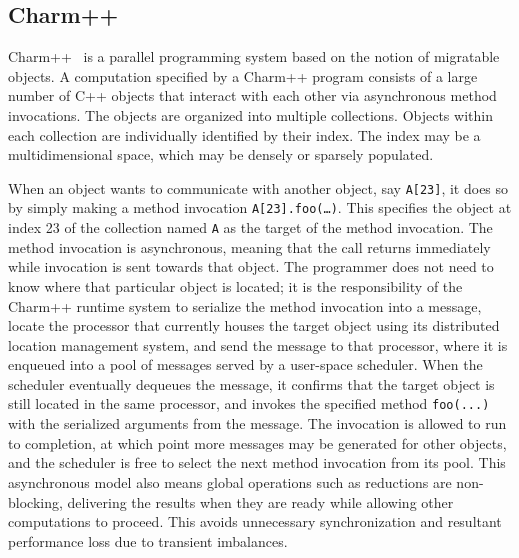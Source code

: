 \documentclass[12pt,letterpaper]{article}
\begin{document}
\subsection{Charm++}
\label{sec:charm}
Charm++~\cite{charm-zenodo, Kale2013, charm2014sc} is a parallel programming system based on the notion of migratable objects. A computation specified by a Charm++ program consists of a large number of C++ objects that interact with each other via asynchronous method invocations. The objects are organized into multiple collections. Objects within each collection are individually identified by their index. The index may be a multidimensional space, which may be densely or sparsely populated.

When an object wants to communicate with another object, say \texttt{A[23]}, it does so by simply making a method invocation \texttt{A[23].foo(…)}. This specifies the object at index 23 of the collection named \texttt{A} as the target of the method invocation. The method invocation is asynchronous, meaning that the call returns immediately while invocation is sent towards that object. The programmer does not need to know where that particular object is located; it is the responsibility of the Charm++ runtime system to serialize the method invocation into a message, locate the processor that currently houses the target object using its distributed location management system, and send the message to that processor, where it is enqueued into a pool of messages served by a user-space scheduler. When the scheduler eventually dequeues the message, it confirms that the target object is still located in the same processor, and invokes the specified method \texttt{foo(...)} with the serialized arguments from the message.  The invocation is allowed to run to completion, at which point more messages may be generated for other objects, and the scheduler is free to select the next method invocation from its pool. This asynchronous model also means global operations such as reductions are non-blocking, delivering the results when they are ready while allowing other computations to proceed. This avoids unnecessary synchronization and resultant performance loss due to transient imbalances.  
\end{document}
